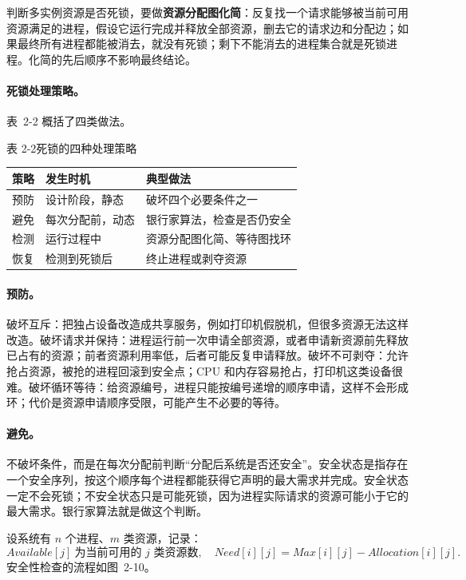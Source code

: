 判断多实例资源是否死锁，要做\textbf{资源分配图化简}：反复找一个请求能够被当前可用资源满足的进程，假设它运行完成并释放全部资源，删去它的请求边和分配边；如果最终所有进程都能被消去，就没有死锁；剩下不能消去的进程集合就是死锁进程。化简的先后顺序不影响最终结论。

\paragraph{死锁处理策略。} 表~2-2 概括了四类做法。

\begin{tablebox}{表 2-2\quad 死锁的四种处理策略}
\centering
\begin{tabular}{lll}
\toprule
策略 & 发生时机 & 典型做法 \\
\midrule
预防 & 设计阶段，静态 & 破坏四个必要条件之一 \\
避免 & 每次分配前，动态 & 银行家算法，检查是否仍安全 \\
检测 & 运行过程中 & 资源分配图化简、等待图找环 \\
恢复 & 检测到死锁后 & 终止进程或剥夺资源 \\
\bottomrule
\end{tabular}
\end{tablebox}

\paragraph{预防。} 破坏互斥：把独占设备改造成共享服务，例如打印机假脱机，但很多资源无法这样改造。破坏请求并保持：进程运行前一次申请全部资源，或者申请新资源前先释放已占有的资源；前者资源利用率低，后者可能反复申请释放。破坏不可剥夺：允许抢占资源，被抢的进程回滚到安全点；CPU 和内存容易抢占，打印机这类设备很难。破坏循环等待：给资源编号，进程只能按编号递增的顺序申请，这样不会形成环；代价是资源申请顺序受限，可能产生不必要的等待。

\paragraph{避免。} 不破坏条件，而是在每次分配前判断“分配后系统是否还安全”。安全状态是指存在一个安全序列，按这个顺序每个进程都能获得它声明的最大需求并完成。安全状态一定不会死锁；不安全状态只是可能死锁，因为进程实际请求的资源可能小于它的最大需求。银行家算法就是做这个判断。

设系统有 $n$ 个进程、$m$ 类资源，记录：
\[
Available[j]\ \text{为当前可用的 }j\text{ 类资源数},\quad
Need[i][j]=Max[i][j]-Allocation[i][j].
\]
安全性检查的流程如图~2-10。

